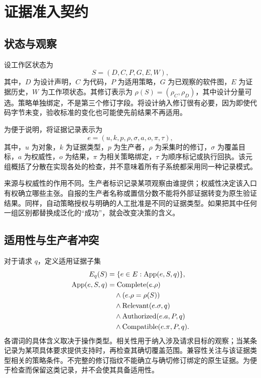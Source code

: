 \section{证据准入契约}
\label{sec:contract}
\subsection{状态与观察}
设工作区状态为
\begin{equation}
 S=(D,C,P,G,E,W),
\end{equation}
其中，$D$ 为设计声明，$C$ 为代码，$P$ 为适用策略，$G$ 为已观察的软件图，$E$ 为证据历史，$W$ 为工作项状态。其修订表示为 $\rho(S)=(\rho_C,\rho_D)$，其中设计分量可选。策略单独绑定，不是第三个修订字段。将设计纳入修订很有必要，因为即使代码字节未变，验收标准的变化也可能使先前结果不再适用。

为便于说明，将证据记录表示为
\begin{equation}
 e=(u,k,p,\rho,\sigma,a,o,\pi,\tau),
\end{equation}
其中，$u$ 为对象，$k$ 为证据类型，$p$ 为生产者，$\rho$ 为采集时的修订，$\sigma$ 为覆盖目标，$a$ 为权威性，$o$ 为结果，$\pi$ 为相关策略绑定，$\tau$ 为顺序标记或执行回执。该元组概括了分散在实现各处的检查，并不意味着所有子系统都采用同一种记录模式。

来源与权威性的作用不同。生产者标识记录某项观察由谁提供；权威性决定该入口有权确立哪些主张。自报的生产者名称或置信分数不能将外部证据转变为原生验证结果。同样，自动策略授权与明确的人工批准是不同的证据类型。如果把其中任何一组区别都替换成泛化的“成功”，就会改变决策的含义。

\subsection{适用性与生产者冲突}
对于请求 $q$，定义适用证据子集
\begin{align}
 E_q(S)&=\{e\in E:\operatorname{App}(e,S,q)\},\\
 \operatorname{App}(e,S,q)&=\operatorname{Complete}(e.\rho) \nonumber\\
 &\quad\land(e.\rho=\rho(S)) \nonumber\\
 &\quad\land\operatorname{Relevant}(e.\sigma,q) \nonumber\\
 &\quad\land\operatorname{Authorized}(e.a,P,q) \nonumber\\
 &\quad\land\operatorname{Compatible}(e.\pi,P,q).
 \label{eq:applicable}
\end{align}
各谓词的具体含义取决于操作类型。相关性用于纳入涉及请求目标的观察；当某条记录为某项具体要求提供支持时，再检查其确切覆盖范围。兼容性关注与该证据类型相关的策略条件。不完整的修订指纹不能确立与确切修订绑定的原生证据。为便于检查而保留这类记录，并不会使其具备适用性。

